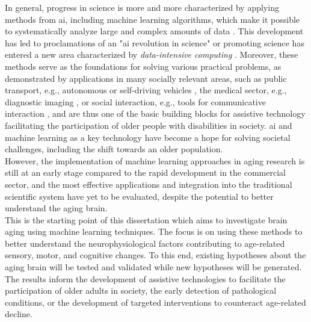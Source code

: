 In general, progress in science is more and more characterized by applying methods from \gls{ai}, including machine learning algorithms, which make it possible to systematically analyze large and complex amounts of data \cite{Brunton2019}. This development has led to proclamations of an "\gls{ai} revolution in science" \cite{Appenzeller2017} or promoting science has entered a new area characterized by \textit{data-intensive computing} \cite{Hey2009}. Moreover, these methods serve as the foundations for solving various practical problems, as demonstrated by applications in many socially relevant areas, such as public transport, e.g., autonomous or self-driving vehicles \cite{Leonard2020}, the medical sector, e.g., diagnostic imaging \cite{Liu2020}, or social interaction, e.g., tools for communicative interaction \cite{Adamopoulou2020}, and are thus one of the basic building blocks for assistive technology facilitating the participation of older people with disabilities in society. \Gls{ai} and machine learning as a key technology have become a hope for solving societal challenges, including the shift towards an older population.\\
However, the implementation of machine learning approaches in aging research is still at an early stage compared to the rapid development in the commercial sector, and the most effective applications and integration into the traditional scientific system have yet to be evaluated, despite the potential to better understand the aging brain.\\
This is the starting point of this dissertation which aims to investigate brain aging using machine learning techniques. The focus is on using these methods to better understand the neurophysiological factors contributing to age-related sensory, motor, and cognitive changes. To this end, existing hypotheses about the aging brain will be tested and validated while new hypotheses will be generated. The results inform the development of assistive technologies to facilitate the participation of older adults in society, the early detection of pathological conditions, or the development of targeted interventions to counteract age-related decline.

